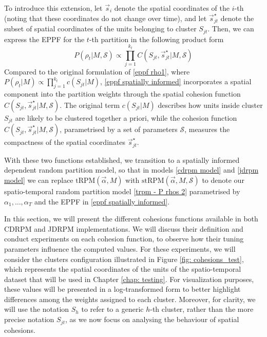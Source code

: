 \documentclass[12pt,	%
	a4paper,		%
	twoside,		%
	openright,		%
	titlepage,%
	]{book}
\theoremstyle{definition}
\begin{document}
To introduce this extension, let $\vec{s}_i$ denote the spatial coordinates of the $i$-th (noting that these coordinates do not change over time), and let $\vec{s}^\star_{jt}$ denote the subset of spatial coordinates of the units belonging to cluster $S_{jt}$. Then, we can express the EPPF for the $t$-th partition in the following product form
\begin{equation}
    P(\rho_t|M,\mathcal{S}) \propto \prod_{j=1}^{k_t} C(S_{jt},\vec{s}_{jt}^\star|M,\mathcal{S})
    \label{eppf spatially informed}
\end{equation}
Compared to the original formulation of \eqref{eppf rho1}, where $P(\rho_t|M) \propto \prod_{j=1}^{k_t} c(S_{jt}|M)$, \eqref{eppf spatially informed} incorporates a spatial component into the partition weights through the spatial cohesion function $C(S_{jt},\vec{s}_{jt}^\star|M,\mathcal{S})$. The original term $c(S_{jt}|M)$ describes how units inside cluster $S_{jt}$ are likely to be clustered together a priori, while the cohesion function $C(S_{jt},\vec{s}_{jt}^\star|M,\mathcal{S})$, parametrised by a set of parameters $\mathcal{S}$, measures the compactness of the spatial coordinates $\vec{s}_{jt}^\star$. 

With these two functions established, we transition to a spatially informed dependent random partition model, so that in models \eqref{cdrpm model} and \eqref{jdrpm model} we can replace $\text{tRPM$(\vec{\alpha},M)$}$ with $\text{stRPM$(\vec{\alpha},M,\mathcal{S})$}$ to denote our spatio-temporal random partition model \eqref{trpm - P rhos 2} parametrised by $\alpha_1,\ldots,\alpha_T$ and the EPPF in \eqref{eppf spatially informed}.

In this section, we will present the different cohesions functions available in both CDRPM and JDRPM implementations. We will discuss their definition and conduct experiments on each cohesion function, to observe how their tuning parameters influence the computed values. For these experiments, we will consider the clusters configuration illustrated in Figure \ref{fig: cohesions_test}, which represents the spatial coordinates of the units of the spatio-temporal dataset that will be used in Chapter \ref{chap: testing}. For visualization purposes, these values will be presented in a log-transformed form to better highlight differences among the weights assigned to each cluster. Moreover, for clarity, we will use the notation $S_h$ to refer to a generic $h$-th cluster, rather than the more precise notation $S_{jt}$, as we now focus on analysing the behaviour of spatial cohesions.
\end{document}
